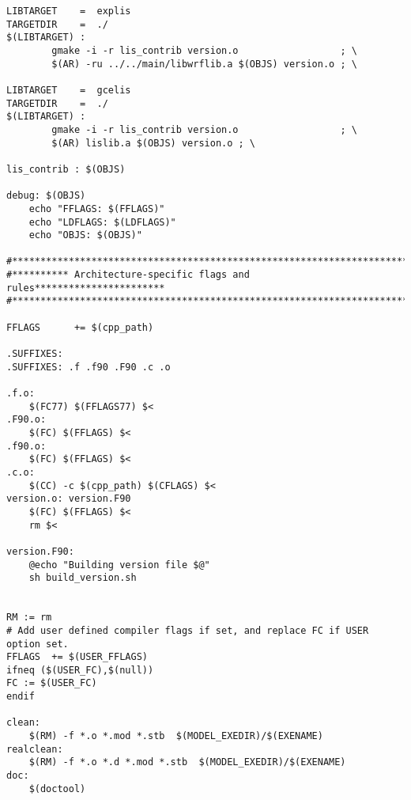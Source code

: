 \begin{verbatim}
LIBTARGET    =  explis
TARGETDIR    =  ./
$(LIBTARGET) : 
		gmake -i -r lis_contrib version.o                  ; \
		$(AR) -ru ../../main/libwrflib.a $(OBJS) version.o ; \

LIBTARGET    =  gcelis
TARGETDIR    =  ./
$(LIBTARGET) : 
		gmake -i -r lis_contrib version.o                  ; \
		$(AR) lislib.a $(OBJS) version.o ; \

lis_contrib : $(OBJS)

debug: $(OBJS)
	echo "FFLAGS: $(FFLAGS)"
	echo "LDFLAGS: $(LDFLAGS)"
	echo "OBJS: $(OBJS)"

#***********************************************************************
#********** Architecture-specific flags and rules***********************
#***********************************************************************

FFLAGS      += $(cpp_path)

.SUFFIXES:
.SUFFIXES: .f .f90 .F90 .c .o

.f.o:
	$(FC77) $(FFLAGS77) $<
.F90.o:
	$(FC) $(FFLAGS) $<
.f90.o:
	$(FC) $(FFLAGS) $<
.c.o:
	$(CC) -c $(cpp_path) $(CFLAGS) $<
version.o: version.F90
	$(FC) $(FFLAGS) $<
	rm $<

version.F90:
	@echo "Building version file $@"
	sh build_version.sh


RM := rm
# Add user defined compiler flags if set, and replace FC if USER option set.
FFLAGS  += $(USER_FFLAGS)
ifneq ($(USER_FC),$(null))
FC := $(USER_FC)
endif

clean:
	$(RM) -f *.o *.mod *.stb  $(MODEL_EXEDIR)/$(EXENAME)
realclean:
	$(RM) -f *.o *.d *.mod *.stb  $(MODEL_EXEDIR)/$(EXENAME)
doc:
	$(doctool) 


\end{verbatim}
